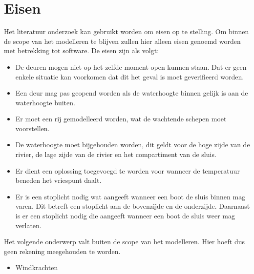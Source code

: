 \documentclass{article}
\begin{document}
\section{Eisen} %
Het literatuur onderzoek kan gebruikt worden om eisen op te stelling. Om binnen de scope van het modelleren te blijven zullen hier alleen eisen genoemd worden met betrekking tot software. De eisen zijn als volgt:
\begin{itemize}
\item De deuren mogen niet op het zelfde moment open kunnen staan. Dat er geen enkele situatie kan voorkomen dat dit het geval is moet geverifieerd worden.
\item Een deur mag pas geopend worden als de waterhoogte binnen gelijk is aan de waterhoogte buiten.
\item Er moet een rij gemodelleerd worden, wat de wachtende schepen moet voorstellen.
\item De waterhoogte moet bijgehouden worden, dit geldt voor de hoge zijde van de rivier, de lage zijde van de rivier en het compartiment van de sluis.
\item Er dient een oplossing toegevoegd te worden voor wanneer de temperatuur beneden het vriespunt daalt.
\item Er is een stoplicht nodig wat aangeeft wanneer een boot de sluis binnen mag varen. Dit betreft een stoplicht aan de bovenzijde en de onderzijde. Daarnaast is er een stoplicht nodig die aangeeft wanneer een boot de sluis weer mag verlaten.


\end{itemize}

Het volgende onderwerp valt buiten de scope van het modelleren. Hier hoeft dus geen rekening meegehouden te worden.
\begin{itemize}
\item Windkrachten
\end{itemize}
\end{document}
